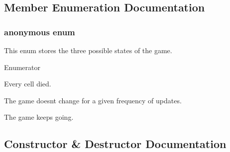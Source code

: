 \subsection{Member Enumeration Documentation}
\subsubsection[{anonymous enum}]{\setlength{\rightskip}{0pt plus 5cm}anonymous enum}\hypertarget{classField_aa6d508a405365e5a6c0414885e525f0c}{}\label{classField_aa6d508a405365e5a6c0414885e525f0c}


This enum stores the three possible states of the game. 

\begin{Desc}
\item[Enumerator]\par
\begin{description}
\item[{\em 
E\+X\+T\+I\+N\+CT\hypertarget{classField_aa6d508a405365e5a6c0414885e525f0ca56fae498f50c63150db6f0a62f5e1fca}{}\label{classField_aa6d508a405365e5a6c0414885e525f0ca56fae498f50c63150db6f0a62f5e1fca}
}]Every cell died. \item[{\em 
S\+T\+A\+B\+LE\hypertarget{classField_aa6d508a405365e5a6c0414885e525f0cabbd2d19da019f8f32b0996513f0a3bf6}{}\label{classField_aa6d508a405365e5a6c0414885e525f0cabbd2d19da019f8f32b0996513f0a3bf6}
}]The game doesn\textquotesingle{}t change for a given frequency of updates. \item[{\em 
N\+O\+R\+M\+AL\hypertarget{classField_aa6d508a405365e5a6c0414885e525f0ca4b7abbee7590e23286d7583cb23e24ee}{}\label{classField_aa6d508a405365e5a6c0414885e525f0ca4b7abbee7590e23286d7583cb23e24ee}
}]The game keeps going. \end{description}
\end{Desc}


\subsection{Constructor \& Destructor Documentation}
